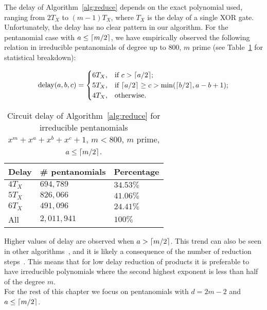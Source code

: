 The delay of Algorithm~\ref{alg:reduce} depends on the exact polynomial used, ranging from $2 T_X$ to $(m-1) T_X$, where $T_X$ is the delay of a single XOR gate. Unfortunately, the delay has no clear pattern in our algorithm. For the pentanomial case with $a \leq \lceil m/2\rceil$, we have empirically observed the following relation in irreducible pentanomials of degree up to 800, $m$ prime (see Table~\ref{table:reduce:delays} for statistical breakdown):

\[
    \text{delay}(a, b, c)= 
\begin{cases}
    6 T_X, & \text{if } c > \lceil a/2\rceil; \\
    5 T_X, & \text{if } \lceil a/2\rceil \geq c > \min(\lceil b/2\rceil, a-b+1); \\
    4 T_X, & \text{otherwise.}
\end{cases}
\]

\begin{table}
\centering
\caption{Circuit delay of Algorithm~\ref{alg:reduce} for irreducible pentanomials $x^m + x^a + x^b + x^c + 1$, $m < 800$, $m$ prime, $a \leq \lceil m/2\rceil$.}
{\begin{tabular}{l l l} \label{table:reduce:delays}
Delay & \# pentanomials & Percentage \\ \hline
$4 T_X$ & $694,789$ & $34.53\%$ \\ \hline
$5 T_X$ & $826,066$ & $41.06\%$ \\ \hline 
$6 T_X$ & $491,096$ & $24.41\%$ \\ \hline
All & $2,011,941$ & $100\%$
\end{tabular}}{}
\end{table}

Higher values of delay are observed when $a > \lceil m/2\rceil$. This trend can also be seen in other algorithms~\cite{fan2015survey}, and it is likely a consequence of the number of reduction steps~\cite{wu2002bit}. This means that for low delay reduction of products it is preferable to have irreducible polynomials where the second highest exponent is less than half of the degree $m$.\\

For the rest of this chapter we focus on pentanomials with $d=2m-2$ and $a \leq \lceil m/2\rceil$.



